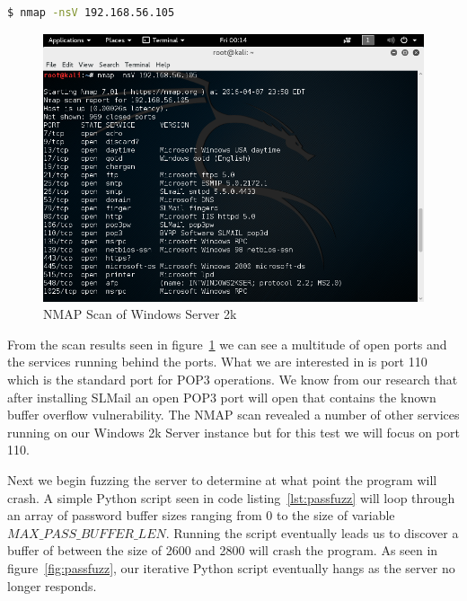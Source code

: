 \documentclass[12pt]{article}
\begin{document}
\begin{lstlisting}[language=bash]
    $ nmap -nsV 192.168.56.105
\end{lstlisting}

\begin{figure}[ht]
    \centering
    \includegraphics[width=5.5in]{images/20160407_nmap_scan.png}
    \caption{NMAP Scan of Windows Server 2k}
    \label{fig:nmapwindows}
\end{figure}

From the scan results seen in figure~\ref{fig:nmapwindows} we can see a
multitude of open ports and the services running behind the ports. What we are
interested in is port 110 which is the standard port for POP3 operations. We
know from our research that after installing SLMail an open POP3 port will
open that contains the known buffer overflow vulnerability. The NMAP scan 
revealed a number of other services running on our Windows 2k Server instance 
but for this test we will focus on port 110. 

Next we begin fuzzing the server to determine at what point the program 
will crash. A simple Python script seen in code listing~\ref{lst:passfuzz}
will loop through an array of password buffer sizes ranging from 0 to
the size of variable $MAX\_PASS\_BUFFER\_LEN$. Running the script eventually
leads us to discover a buffer of between the size of 2600 and 2800 will crash
the program. As seen in figure~\ref{fig:passfuzz}, our iterative Python
script eventually hangs as the server no longer responds.
\end{document}

